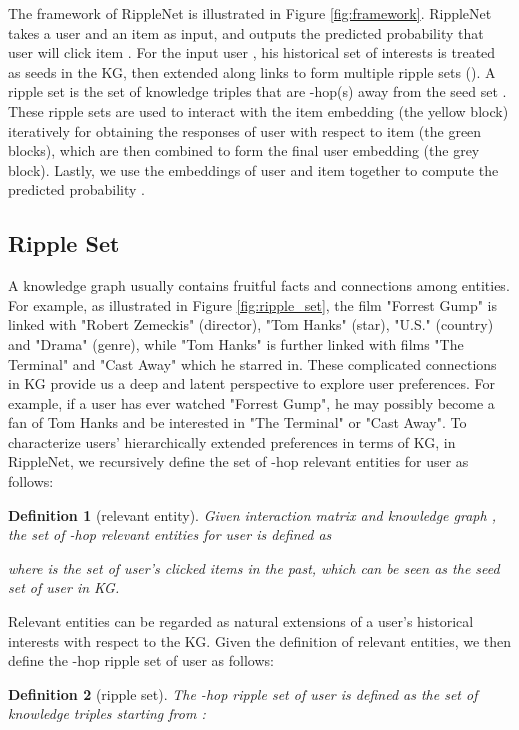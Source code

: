 \documentclass[sigconf]{acmart}
\newtheorem{definition}{Definition}
\begin{document}
		The framework of RippleNet is illustrated in Figure \ref{fig:framework}.
		RippleNet takes a user  and an item  as input, and outputs the predicted probability that user  will click item .
		For the input user , his historical set of interests  is treated as seeds in the KG, then extended along links to form multiple ripple sets  ().
		A ripple set  is the set of knowledge triples that are -hop(s) away from the seed set .
		These ripple sets are used to interact with the item embedding (the yellow block) iteratively for obtaining the responses of user  with respect to item  (the green blocks), which are then combined to form the final user embedding (the grey block).
		Lastly, we use the embeddings of user  and item  together to compute the predicted probability .		
		
		
	\subsection{Ripple Set}
	\label{sec:ripple_set}		
		A knowledge graph usually contains fruitful facts and connections among entities.
		For example, as illustrated in Figure \ref{fig:ripple_set}, the film "Forrest Gump" is linked with "Robert Zemeckis" (director), "Tom Hanks" (star), "U.S." (country) and "Drama" (genre), while "Tom Hanks" is further linked with films "The Terminal" and "Cast Away" which he starred in.
		These complicated connections in KG provide us a deep and latent perspective to explore user preferences.
		For example, if a user has ever watched "Forrest Gump", he may possibly become a fan of Tom Hanks and be interested in "The Terminal" or "Cast Away".
		To characterize users' hierarchically extended preferences in terms of KG, in RippleNet, we recursively define the set of -hop relevant entities for user  as follows:
		
		\begin{definition}[relevant entity]
			Given interaction matrix  and knowledge graph , the set of -hop relevant entities for user  is defined as
			
		where  is the set of user's clicked items in the past, which can be seen as the seed set of user  in KG.
		\end{definition}
		
		Relevant entities can be regarded as natural extensions of a user's historical interests with respect to the KG.
		Given the definition of relevant entities, we then define the -hop ripple set of user  as follows:
		
		\begin{definition}[ripple set]
			The -hop ripple set of user  is defined as the set of knowledge triples starting from :
		
		\end{definition}
		
\end{document}
